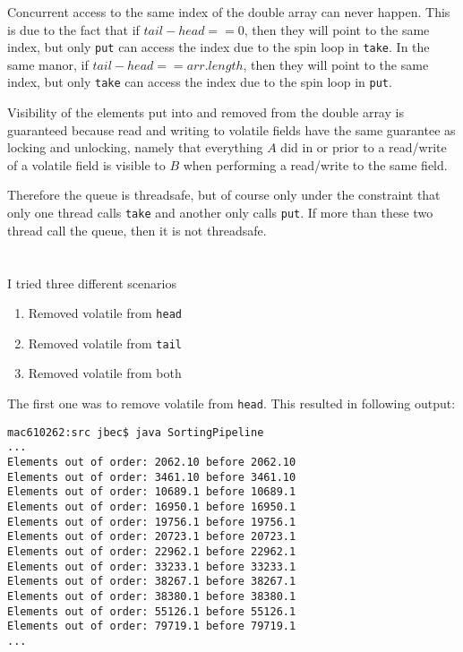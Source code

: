 \documentclass{ituhandin}
\begin{document}
Concurrent access to the same index of the double array can never happen. This is due to the fact that if $tail - head == 0$, then they will point to the same index, but only \texttt{put} can access the index due to the spin loop in \texttt{take}. In the same manor, if $tail - head == arr.length$, then they will point to the same index, but only \texttt{take} can access the index due to the spin loop in \texttt{put}.

Visibility of the elements put into and removed from the double array is guaranteed because read and writing to volatile fields have the same guarantee as locking and unlocking, namely that everything $A$ did in or prior to a read/write of a volatile field is visible to $B$ when performing a read/write to the same field.  

Therefore the queue is threadsafe, but of course only under the constraint that only one thread calls \texttt{take} and another only calls \texttt{put}. If more than these two thread call the queue, then it is not threadsafe.

\section{} %
I tried three different scenarios
\begin{enumerate}
    \item Removed volatile from \texttt{head}
    \item Removed volatile from \texttt{tail}
    \item Removed volatile from both
\end{enumerate}

The first one was to remove volatile from \texttt{head}. This resulted in following output:

\begin{lstlisting}[language={},frame={}]
mac610262:src jbec$ java SortingPipeline
...
Elements out of order: 2062.10 before 2062.10
Elements out of order: 3461.10 before 3461.10
Elements out of order: 10689.1 before 10689.1
Elements out of order: 16950.1 before 16950.1
Elements out of order: 19756.1 before 19756.1
Elements out of order: 20723.1 before 20723.1
Elements out of order: 22962.1 before 22962.1
Elements out of order: 33233.1 before 33233.1
Elements out of order: 38267.1 before 38267.1
Elements out of order: 38380.1 before 38380.1
Elements out of order: 55126.1 before 55126.1
Elements out of order: 79719.1 before 79719.1
...
\end{lstlisting}
\end{document}
